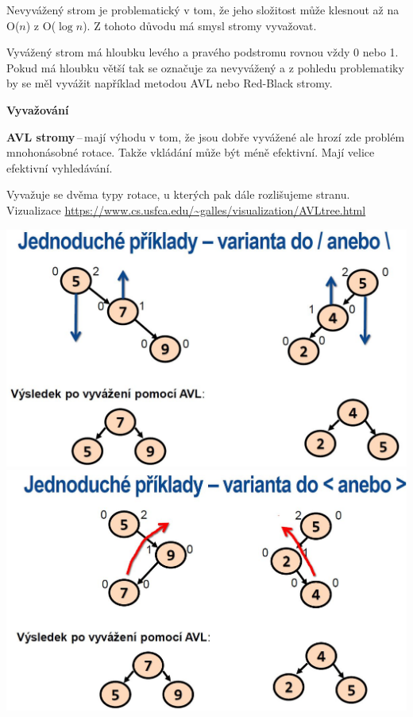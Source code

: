 Nevyvážený strom je problematický v tom, že jeho složitost může klesnout až na O($n$) z O($\log{n}$). Z tohoto důvodu má smysl stromy vyvažovat.

Vyvážený strom má hloubku levého a pravého podstromu rovnou vždy 0 nebo 1. Pokud má hloubku větší tak se označuje za nevyvážený a z pohledu problematiky by se měl vyvážit například metodou AVL nebo Red-Black stromy.

\begin{Large}\vspace{0,5cm} \textbf{Vyvažování}
\end{Large}

\textbf{AVL stromy}\,--\,mají výhodu v tom, že jsou dobře vyvážené ale hrozí zde problém mnohonásobné rotace. Takže vkládání může být méně efektivní. Mají velice efektivní vyhledávání.

Vyvažuje se dvěma typy rotace, u kterých pak dále rozlišujeme stranu. Vizualizace \url{https://www.cs.usfca.edu/~galles/visualization/AVLtree.html}


\includegraphics[scale=0.3]{BPC-TIN/images/Rotation1Type.JPG}
\includegraphics[scale=0.3]{BPC-TIN/images/Rotation2Type.JPG}


